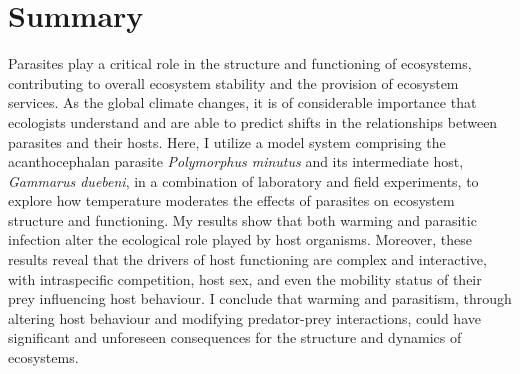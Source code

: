 \chapter*{Summary}

Parasites play a critical role in the structure and functioning of ecosystems, contributing to overall ecosystem stability and the provision of ecosystem services. As the global climate changes, it is of considerable importance that ecologists understand and are able to predict shifts in the relationships between parasites and their hosts. Here, I utilize a model system comprising the acanthocephalan parasite \emph{Polymorphus minutus} and its intermediate host, \emph{Gammarus duebeni}, in a combination of laboratory and field experiments, to explore how temperature moderates the effects of parasites on ecosystem structure and functioning. My results show that both warming and parasitic infection alter the ecological role played by host organisms. Moreover, these results reveal that the drivers of host functioning are complex and interactive, with intraspecific competition, host sex, and even the mobility status of their prey influencing host behaviour. I conclude that warming and parasitism, through altering host behaviour and modifying predator-prey interactions, could have significant and unforeseen consequences for the structure and dynamics of ecosystems.